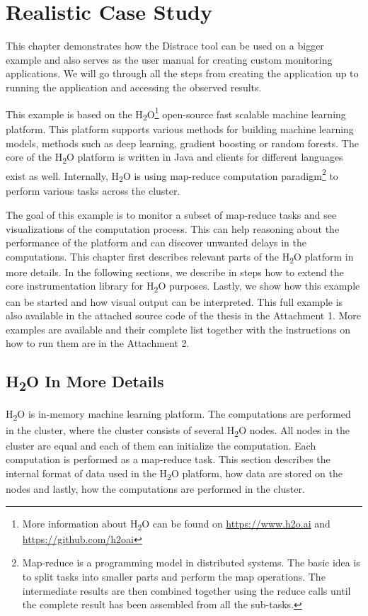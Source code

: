 \chapter{Realistic Case Study}
\label{chap:big_example}
This chapter demonstrates how the Distrace tool can be used on a bigger example and also serves as the user manual for creating custom monitoring applications. We will go through all the steps from creating the application up to running the application and accessing the observed results.

This example is based on the H\textsubscript{2}O\footnote{More information about H\textsubscript{2}O can be found on \url{https://www.h2o.ai} and \url{https://github.com/h2oai}} open-source fast scalable machine learning platform. This platform supports various methods for building machine learning models, methods such as deep learning, gradient boosting or random forests. The core of the H\textsubscript{2}O platform is written in Java and clients for different languages exist as well. Internally, H\textsubscript{2}O is using map-reduce computation paradigm\footnote{Map-reduce is a programming model in distributed systems. The basic idea is to split tasks into smaller parts and perform the map operations. The intermediate results are then combined together using the reduce calls until the complete result has been assembled from all the sub-tasks.} to perform various tasks across the cluster.

The goal of this example is to monitor a subset of map-reduce tasks and see visualizations of the computation process. This can help reasoning about the performance of the platform and can discover unwanted delays in the computations. This chapter first describes relevant parts of the H\textsubscript{2}O platform in more details. In the following sections, we describe in steps how to extend the core instrumentation library for H\textsubscript{2}O purposes. Lastly, we show how this example can be started and how visual output can be interpreted. 
This full example is also available in the attached source code of the thesis in the Attachment 1. More examples are available and their complete list together with the instructions on how to run them are in the Attachment 2.

\section{H\textsubscript{2}O In More Details}
H\textsubscript{2}O is in-memory machine learning platform. The computations are performed in the cluster, where the cluster consists of several H\textsubscript{2}O nodes. All nodes in the cluster are equal and each of them can initialize the computation. Each computation is performed as a map-reduce task. This section describes the internal format of data used in the H\textsubscript{2}O platform, how data are stored on the nodes and lastly, how the computations are performed in the cluster. 


